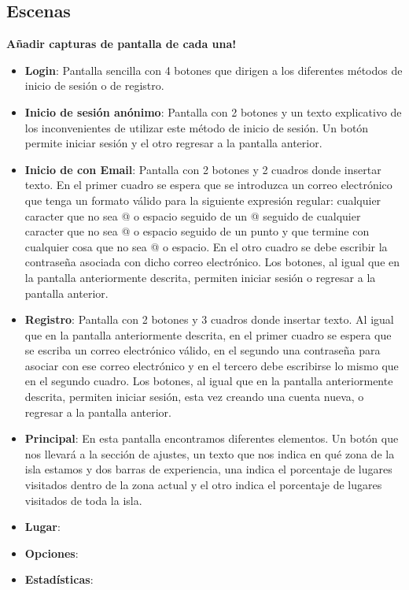\documentclass{report}
\begin{document}
\subsection{Escenas}
\textbf{Añadir capturas de pantalla de cada una!}
\begin{itemize}
\item \textbf{Login}: Pantalla sencilla con 4 botones que dirigen a los diferentes métodos de inicio de sesión o de registro.
\item \textbf{Inicio de sesión anónimo}: Pantalla con 2 botones y un texto explicativo de los inconvenientes de utilizar este método de inicio de sesión. Un botón permite iniciar sesión y el otro regresar a la pantalla anterior.
\item \textbf{Inicio de con Email}: Pantalla con 2 botones y 2 cuadros donde insertar texto. En el primer cuadro se espera que se introduzca un correo electrónico que tenga un formato válido para la siguiente expresión regular: cualquier caracter que no sea @ o espacio seguido de un @ seguido de cualquier caracter que no sea @ o espacio seguido de un punto y que termine con cualquier cosa que no sea @ o espacio. En el otro cuadro se debe escribir la contraseña asociada con dicho correo electrónico. Los botones, al igual que en la pantalla anteriormente descrita, permiten iniciar sesión o regresar a la pantalla anterior.
\item \textbf{Registro}: Pantalla con 2 botones y 3 cuadros donde insertar texto. Al igual que en la pantalla anteriormente descrita, en el primer cuadro se espera que se escriba un correo electrónico válido, en el segundo una contraseña para asociar con ese correo electrónico y en el tercero debe escribirse lo mismo que en el segundo cuadro. Los botones, al igual que en la pantalla anteriormente descrita, permiten iniciar sesión, esta vez creando una cuenta nueva, o regresar a la pantalla anterior.
\item \textbf{Principal}: En esta pantalla encontramos diferentes elementos. Un botón que nos llevará a la sección de ajustes, un texto que nos indica en qué zona de la isla estamos y dos barras de experiencia, una indica el porcentaje de lugares visitados dentro de la zona actual y el otro indica el porcentaje de lugares visitados de toda la isla.
\item \textbf{Lugar}:
\item \textbf{Opciones}:
\item \textbf{Estadísticas}:
\end{itemize}
\end{document}
